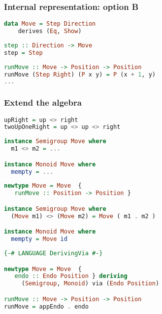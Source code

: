 \documentclass[10pt]{beamer}
\begin{document}
\begin{frame}[fragile]
  \frametitle{Internal representation: option B}
\begin{lstlisting}[language=haskell, basicstyle=\ttfamily]
data Move = Step Direction
    derives (Eq, Show)
\end{lstlisting}
\end{frame}
\begin{frame}[fragile]
  \begin{lstlisting}[language=haskell, basicstyle=\ttfamily]
step :: Direction -> Move
step = Step
\end{lstlisting}
\end{frame}
\begin{frame}[fragile]
\begin{lstlisting}[language=haskell, basicstyle=\ttfamily]
runMove :: Move -> Position -> Position
runMove (Step Right) (P x y) = P (x + 1, y)
...
\end{lstlisting}
\end{frame}


\begin{frame}[fragile]
  \frametitle{Extend the algebra}
\begin{lstlisting}[language=haskell, basicstyle=\ttfamily]
upRight = up <> right
twoUpOneRight = up <> up <> right
\end{lstlisting}
\end{frame}
\begin{frame}[fragile]
\begin{lstlisting}[language=haskell, basicstyle=\ttfamily]
instance Semigroup Move where
  m1 <> m2 = ...

instance Monoid Move where
  mempty = ...
\end{lstlisting}
\end{frame}
\begin{frame}[fragile]
\begin{lstlisting}[language=haskell, basicstyle=\ttfamily]
newtype Move = Move  {
   runMove :: Position -> Position }

instance Semigroup Move where
  (Move m1) <> (Move m2) = Move ( m1 . m2 )

instance Monoid Move where
  mempty = Move id

\end{lstlisting}
\end{frame}

\begin{frame}[fragile]
\begin{lstlisting}[language=haskell, basicstyle=\ttfamily]
{-# LANGUAGE DerivingVia #-}

newtype Move = Move  {
   endo :: Endo Position } deriving
     (Semigroup, Monoid) via (Endo Position)

runMove :: Move -> Position -> Position
runMove = appEndo . endo

\end{lstlisting}
\end{frame}
\end{document}
